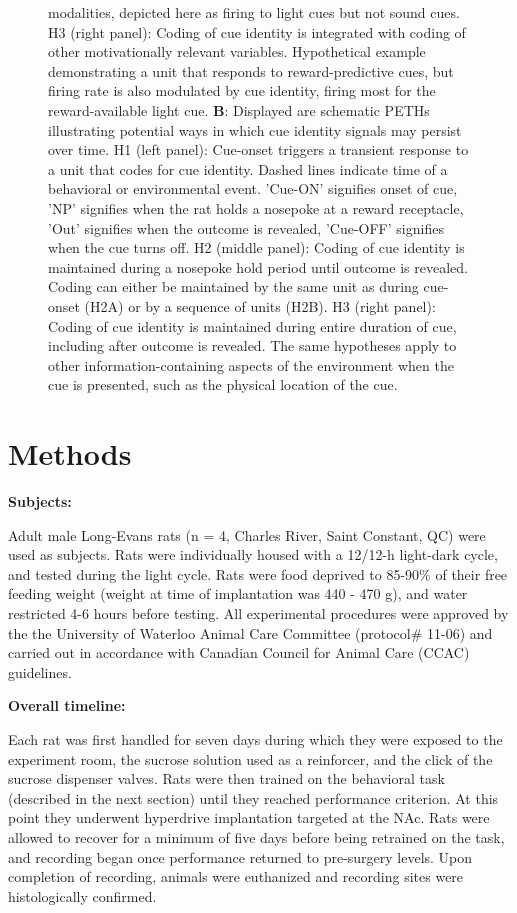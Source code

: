 \documentclass[11pt]{article}
\newcommand{\bsf}[1]{\textbf{#1}}
\begin{document}
\begin{figure}[h]
{  modalities, depicted here as firing to light cues but not sound
  cues. H3 (right panel): Coding of cue identity is integrated with
  coding of other motivationally relevant variables. Hypothetical
  example demonstrating a unit that responds to reward-predictive
  cues, but firing rate is also modulated by cue identity, firing most
  for the reward-available light cue. \bsf{B}: Displayed are schematic
  PETHs illustrating potential ways in which cue identity signals may
  persist over time. H1 (left panel): Cue-onset triggers a transient
  response to a unit that codes for cue identity. Dashed lines
  indicate time of a behavioral or environmental event. 'Cue-ON'
  signifies onset of cue, 'NP' signifies when the rat holds a nosepoke
  at a reward receptacle, 'Out' signifies when the outcome is
  revealed, 'Cue-OFF' signifies when the cue turns off. H2 (middle
  panel): Coding of cue identity is maintained during a nosepoke hold
  period until outcome is revealed. Coding can either be maintained by
  the same unit as during cue-onset (H2A) or by a sequence of units
  (H2B). H3 (right panel): Coding of cue identity is maintained during
  entire duration of cue, including after outcome is revealed. The
  same hypotheses apply to other information-containing aspects of the
  environment when the cue is presented, such as the physical location
  of the cue.}
\label{fig:schematic}
\end{figure}

\section*{Methods}

{\bf Subjects:}

Adult male Long-Evans rats (n = 4, Charles River, Saint Constant, QC)
were used as subjects. Rats were individually housed with a 12/12-h
light-dark cycle, and tested during the light cycle. Rats were food
deprived to 85-90\% of their free feeding weight (weight at time of
implantation was 440 - 470 g), and water restricted 4-6 hours before
testing. All experimental procedures were approved by the the
University of Waterloo Animal Care Committee (protocol\# 11-06) and
carried out in accordance with Canadian Council for Animal Care (CCAC)
guidelines.

{\bf Overall timeline:}

Each rat was first handled for seven days during which they were
exposed to the experiment room, the sucrose solution used as a
reinforcer, and the click of the sucrose dispenser valves. Rats were
then trained on the behavioral task (described in the next section)
until they reached performance criterion. At this point they
underwent hyperdrive implantation targeted at the NAc. Rats were
allowed to recover for a minimum of five days before being retrained
on the task, and recording began once performance returned to
pre-surgery levels. Upon completion of recording, animals were
euthanized and recording sites were histologically confirmed.
\end{document}
